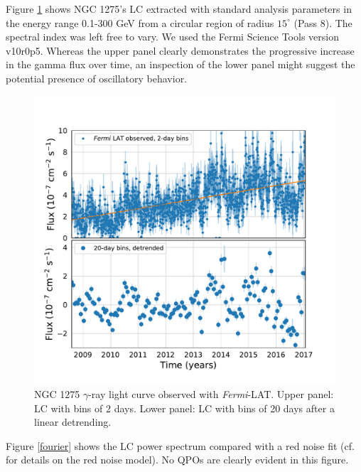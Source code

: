 \documentclass{iau}
\begin{document}
Figure \ref{lc} shows NGC 1275's LC extracted with standard analysis parameters in the energy range 0.1-300 GeV from a circular region of radius $15^{\circ}$ (Pass 8). The spectral index was left free to vary. We used the Fermi Science Tools version v10r0p5. Whereas the upper panel clearly demonstrates the progressive increase in the gamma flux over time, an inspection of the lower panel might suggest the potential presence of oscillatory behavior. 

\begin{figure}[h]
\begin{center}
\includegraphics[width=0.7\linewidth]{figures/observations.pdf} 
\caption{NGC 1275 $\gamma$-ray light curve observed with \textit{Fermi}-LAT. Upper panel: LC with bins of 2 days. Lower panel: LC with bins of 20 days after a linear detrending.}
\label{lc}
\end{center}
\end{figure}

Figure \ref{fourier} shows the LC power spectrum compared with a red noise fit (cf. \cite[Torrence \& Compo 1998]{Torrence1998} for details on the red noise model). 
No QPOs are clearly evident in this figure.
\end{document}
